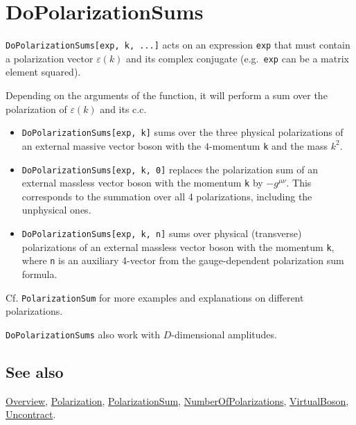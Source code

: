 \documentclass[../FeynCalcManual.tex]{subfiles}
\begin{document}
\hypertarget{dopolarizationsums}{%
\section{DoPolarizationSums}\label{dopolarizationsums}}

\texttt{DoPolarizationSums[\allowbreak{}exp,\ \allowbreak{}k,\ \allowbreak{}...]}
acts on an expression \texttt{exp} that must contain a polarization
vector \(\varepsilon(k)\) and its complex conjugate (e.g.~\texttt{exp}
can be a matrix element squared).

Depending on the arguments of the function, it will perform a sum over
the polarization of \(\varepsilon(k)\) and its c.c.

\begin{itemize}
\tightlist
\item
  \texttt{DoPolarizationSums[\allowbreak{}exp,\ \allowbreak{}k]} sums
  over the three physical polarizations of an external massive vector
  boson with the \(4\)-momentum \texttt{k} and the mass \(k^2\).
\item
  \texttt{DoPolarizationSums[\allowbreak{}exp,\ \allowbreak{}k,\ \allowbreak{}0]}
  replaces the polarization sum of an external massless vector boson
  with the momentum \texttt{k} by \(-g^{\mu \nu}\). This corresponds to
  the summation over all 4 polarizations, including the unphysical ones.
\item
  \texttt{DoPolarizationSums[\allowbreak{}exp,\ \allowbreak{}k,\ \allowbreak{}n]}
  sums over physical (transverse) polarizations of an external massless
  vector boson with the momentum \texttt{k}, where \texttt{n} is an
  auxiliary 4-vector from the gauge-dependent polarization sum formula.
\end{itemize}

Cf. \texttt{PolarizationSum} for more examples and explanations on
different polarizations.

\texttt{DoPolarizationSums} also work with \(D\)-dimensional amplitudes.

\subsection{See also}

\hyperlink{toc}{Overview}, \hyperlink{polarization}{Polarization},
\hyperlink{polarizationsum}{PolarizationSum},
\hyperlink{numberofpolarizations}{NumberOfPolarizations},
\hyperlink{virtualboson}{VirtualBoson},
\hyperlink{uncontract}{Uncontract}.
\end{document}

